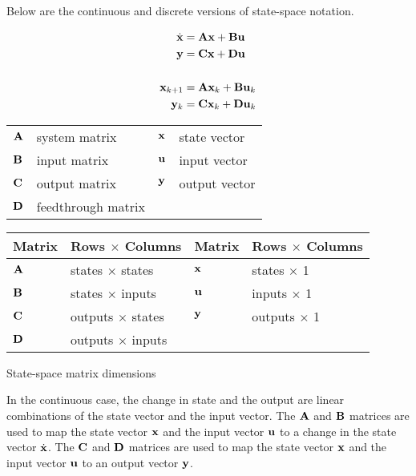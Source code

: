 Below are the continuous and discrete versions of state-space notation.
\begin{definition}%
  \begin{align}
    \dot{\mathbf{x}} &= \mathbf{A}\mathbf{x} + \mathbf{B}\mathbf{u} \label{eq:ss_ctrl_x} \\
    \mathbf{y} &= \mathbf{C}\mathbf{x} + \mathbf{D}\mathbf{u} \label{eq:ss_ctrl_y} \\
    \nonumber \\
    \mathbf{x}_{k+1} &= \mathbf{A}\mathbf{x}_k + \mathbf{B}\mathbf{u}_k \label{eq:ssz_ctrl_x} \\
    \mathbf{y}_k &= \mathbf{C}\mathbf{x}_k + \mathbf{D}\mathbf{u}_k \label{eq:ssz_ctrl_y}
  \end{align}
  \begin{figurekey}
    \begin{tabular}{llll}
      $\mathbf{A}$ & system matrix      & $\mathbf{x}$ & state vector \\
      $\mathbf{B}$ & input matrix       & $\mathbf{u}$ & input vector \\
      $\mathbf{C}$ & output matrix      & $\mathbf{y}$ & output vector \\
      $\mathbf{D}$ & feedthrough matrix &  &  \\
    \end{tabular}
  \end{figurekey}
\end{definition}
\begin{booktable}
  \begin{tabular}{|ll|ll|}
    \hline
    \rowcolor{headingbg}
    \textbf{Matrix} & \textbf{Rows $\times$ Columns} &
    \textbf{Matrix} & \textbf{Rows $\times$ Columns} \\
    \hline
    $\mathbf{A}$ & states $\times$ states & $\mathbf{x}$ & states $\times$ 1 \\
    $\mathbf{B}$ & states $\times$ inputs & $\mathbf{u}$ & inputs $\times$ 1 \\
    $\mathbf{C}$ & outputs $\times$ states & $\mathbf{y}$ & outputs $\times$ 1 \\
    $\mathbf{D}$ & outputs $\times$ inputs &  &  \\
    \hline
  \end{tabular}
  \caption{State-space matrix dimensions}
\end{booktable}

In the continuous case, the change in \gls{state} and the \gls{output} are
linear combinations of the \gls{state} vector and the \gls{input} vector. The
$\mathbf{A}$ and $\mathbf{B}$ matrices are used to map the \gls{state} vector
$\mathbf{x}$ and the \gls{input} vector $\mathbf{u}$ to a change in the \gls{state}
vector $\dot{\mathbf{x}}$. The $\mathbf{C}$ and $\mathbf{D}$ matrices are used to map the
\gls{state} vector $\mathbf{x}$ and the \gls{input} vector $\mathbf{u}$ to an
\gls{output} vector $\mathbf{y}$.
